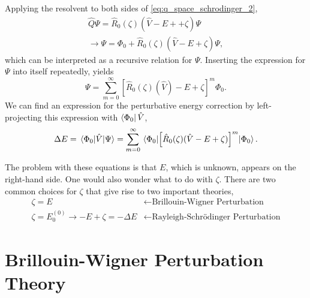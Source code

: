 Applying the resolvent to both sides of \autoref{eq:q_space_schrodinger_2},
\begin{equation}
    \begin{gathered}
    \hat{Q}\Psi = \hat{R}_0(\zeta)(\hat{V} - E + + \zeta)\Psi \\
    \to \Psi = \Phi_0 + \hat{R}_0(\zeta)(\hat{V} - E + \zeta)\Psi,
    \end{gathered}
\end{equation}
which can be interpreted as a recursive relation for $\Psi$. Inserting the 
expression for $\Psi$ into itself repeatedly, yields 
\begin{equation}
    \label{eq:perturbation_wavefunction}
    \Psi = \sum_{m=0}^\infty [\hat{R}_0(\zeta)(\hat{V}) - E + \zeta ]^m \Phi_0.
\end{equation}
We can find an expression for the perturbative energy correction by left-projecting 
this expression with $\bra{\Phi_0}\hat{V}$,
\begin{equation}
    \label{eq:perturbation_energy}
    \Delta E = \mel{\Phi_0}{\hat{V}}{\Psi} 
        = \sum_{m=0}^\infty \mel*{\Phi_0}
        {
            \left[\hat{R}_0(\zeta)(\hat{V} - E + \zeta)\right]^m
        }{\Phi_0}.
\end{equation}

The problem with these equations is that $E$, which is unknown, appears on the right-hand
side. One would also wonder what to do with $\zeta$. There are two common 
choices for $\zeta$ that give rise to two important theories,
\begin{align*}
    \zeta = E &\leftarrow \text{Brillouin-Wigner Perturbation} \\
    \zeta = E^{(0)}_0 \to -E + \zeta = -\Delta E 
        &\leftarrow \text{Rayleigh-Schrödinger Perturbation}
\end{align*}

\section{Brillouin-Wigner Perturbation Theory}

